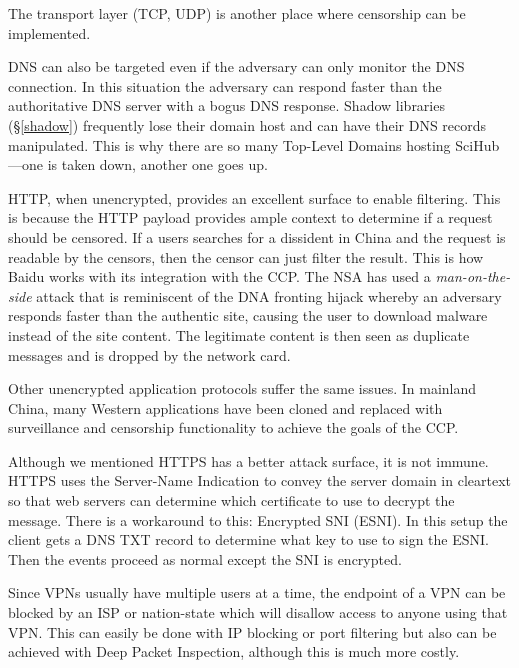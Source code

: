 The transport layer (TCP, UDP) is another place where censorship can be
implemented.\cite[p.\@ 5]{wendzelSurveyInternetCensorship2025}

DNS can also be targeted even if the adversary can only monitor the DNS
connection. In this situation the adversary can respond faster than the
authoritative DNS server with a bogus DNS response.\cite[p.\@
      6]{wendzelSurveyInternetCensorship2025} Shadow libraries (\S \ref{shadow})
frequently lose their domain host and can have their DNS records manipulated.
This is why there are so many Top-Level Domains hosting SciHub---one is taken
down, another one goes up.

HTTP, when unencrypted, provides an excellent surface to enable filtering. This
is because the HTTP payload provides ample context to determine if a request
should be censored. If a users searches for a dissident in China and the request
is readable by the censors, then the censor can just filter the result. This is
how Baidu works with its integration with the CCP. The NSA has used a
\emph{man-on-the-side} attack that is reminiscent of the DNA fronting hijack
whereby an adversary responds faster than the authentic site, causing the user
to download malware instead of the site content. The legitimate content is then
seen as duplicate messages and is dropped by the network card.

Other unencrypted application protocols suffer the same issues. In mainland
China, many Western applications have been cloned and replaced with surveillance
and censorship functionality to achieve the goals of the CCP.

Although we mentioned HTTPS has a better attack surface, it is not immune. HTTPS
uses the Server-Name Indication to convey the server domain in cleartext so that
web servers can determine which certificate to use to decrypt the message. There
is a workaround to this: Encrypted SNI (ESNI). \cite[p.\@
      8]{wendzelSurveyInternetCensorship2025} In this setup the client gets a DNS TXT
record to determine what key to use to sign the ESNI. Then the events proceed as
normal except the SNI is encrypted.

Since VPNs usually have multiple users at a time, the endpoint of a VPN can be
blocked by an ISP or nation-state which will disallow access to anyone using
that VPN.\cite[p.\@ 8]{wendzelSurveyInternetCensorship2025} This can easily be
done with IP blocking or port filtering but also can be achieved with Deep
Packet Inspection, although this is much more costly.

